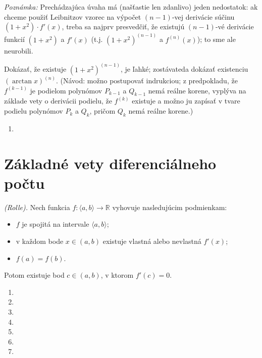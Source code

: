 \textit{Poznámka:}
Prechádzajúca úvaha má (našťastie len zdanlivo) jeden nedostatok: ak chceme použiť Leibnitzov vzorec na výpočet $(n-1)$-vej derivácie súčinu $(1+x^2)\cdot f'(x)$, treba sa najprv presvedčiť, že existujú $(n-1)$-vé derivácie funkcií $(1+x^2)$ a $f'(x)$ (t.j. $(1+x^2)^{(n-1)}$ a $f^{(n)}(x)$); to sme ale neurobili.

Dokázať, že existuje $(1+x^2)^{(n-1)}$, je ľahké; zostávateda dokázať existenciu $(\arctan x)^{(n)}$. (Návod: možno postupovať indrukciou; z predpokladu, že $f^{(k-1)}$ je podielom polynómov $P_{k-1}$ a $Q_{k-1}$ nemá reálne korene, vyplýva na základe vety o derivácii podielu, že $f^{(k)}$ existuje a možno ju zapísať v tvare podielu polynómov $P_k$ a $Q_k$, pričom $Q_k$ nemá reálne korene.)

\begin{enumerate}[resume]
	\item {}
\end{enumerate}

\section{Základné vety diferenciálneho počtu}
\begin{veta}
\textit{(Rolle).}
Nech funkcia $f:\langle a,b \rangle\rightarrow \mathbb{R}$ vyhovuje nasledujúcim podmienkam:
\begin{itemize}
\item $f$ je spojitá na intervale $\langle a,b \rangle$;
\item v každom bode $x\in (a,b)$ existuje vlastná alebo nevlastná $f'(x)$;
\item $f(a)=f(b)$.
\end{itemize}
Potom existuje bod $c\in (a,b)$, v ktorom $f'(c)=0$.
\end{veta}

\begin{enumerate}[resume]
	\item {}
	\item {}
	\item {}
	\item {}
	\item {}
	\item {}
	\item {}
\end{enumerate}

